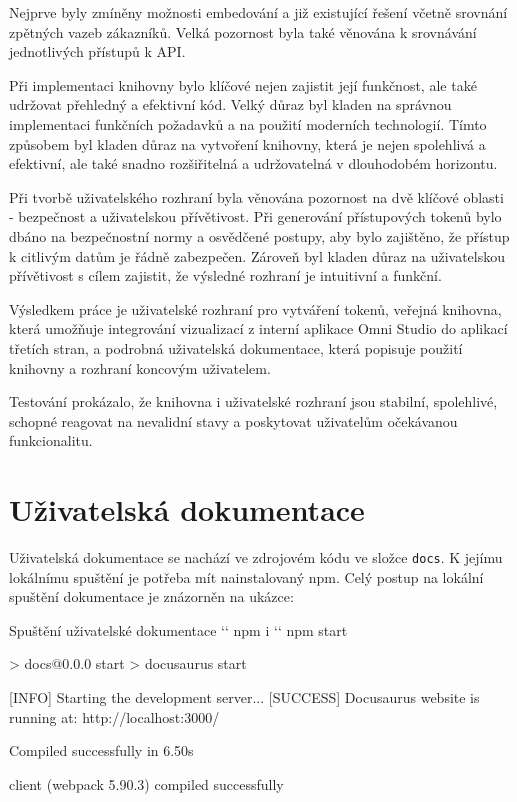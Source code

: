 \documentclass[czech, bc, kiv, he, iso690numb]{fasthesis}
\begin{document}
Nejprve byly zmíněny možnosti embedování a již existující řešení včetně srovnání zpětných vazeb zákazníků. Velká pozornost byla také
věnována k srovnávání jednotlivých přístupů k API.

Při implementaci knihovny bylo klíčové nejen zajistit její funkčnost, ale také udržovat přehledný a efektivní kód.
Velký důraz byl kladen na správnou implementaci funkčních požadavků a na použití moderních technologií. 
Tímto způsobem byl kladen důraz na vytvoření knihovny, která je nejen spolehlivá a efektivní, ale také snadno rozšiřitelná a udržovatelná v dlouhodobém horizontu.

Při tvorbě uživatelského rozhraní byla věnována pozornost na dvě klíčové oblasti - bezpečnost a uživatelskou přívětivost. Při generování přístupových tokenů bylo dbáno na
bezpečnostní normy a osvědčené postupy, aby bylo zajištěno, že přístup k citlivým datům je řádně zabezpečen. 
Zároveň byl kladen důraz na uživatelskou přívětivost s cílem zajistit, že výsledné rozhraní je intuitivní a funkční.

Výsledkem práce je uživatelské rozhraní pro vytváření tokenů, veřejná knihovna, která umožňuje integrování vizualizací z interní aplikace Omni Studio
do aplikací třetích stran, a podrobná uživatelská dokumentace, která popisuje použití knihovny a rozhraní koncovým uživatelem.

Testování prokázalo, že knihovna i uživatelské rozhraní jsou stabilní, spolehlivé, schopné reagovat na nevalidní stavy a poskytovat uživatelům očekávanou funkcionalitu. 



\appendix
\chapter{Uživatelská dokumentace}\label{app:docuDocs}
Uživatelská dokumentace se nachází ve zdrojovém kódu ve složce \texttt{docs}. K jejímu lokálnímu spuštění je potřeba mít nainstalovaný npm.
Celý postup na lokální spuštění dokumentace je znázorněn na ukázce:

\begin{console}{Spuštění uživatelské dokumentace}
`\winprompt` npm i
`\winprompt` npm start

> docs@0.0.0 start
> docusaurus start

[INFO] Starting the development server...
[SUCCESS] Docusaurus website is running at: http://localhost:3000/

 Compiled successfully in 6.50s

client (webpack 5.90.3) compiled successfully
\end{console}
\end{document}
